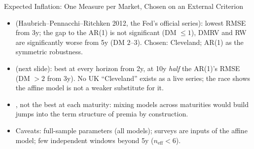 \begin{frame}[t]{Expected Inflation: One Measure per Market, Chosen on an External Criterion}
\vspace{0.06cm}
\raggedright\scriptsize
\begin{itemize}\itemsep=0.05cm\scriptsize
  \item {} (Haubrich--Pennacchi--Ritchken 2012, the Fed's official series): lowest
        RMSE from 3y; the gap to the AR(1) is not significant (DM $\le 1$), DMRV and RW are
        significantly worse from 5y (DM $2$--$3$). Chosen: Cleveland; AR(1) as the symmetric robustness.
  \item {} (next slide): best at every horizon from 2y, at 10y
        \emph{half} the AR(1)'s RMSE (DM $>2$ from 3y). No UK ``Cleveland'' exists as a live series;
        the race shows the affine model is not a weaker substitute for it.
  \item {}, not the best at each maturity: mixing models across maturities
        would build jumps into the term structure of premia by construction.
  \item Caveats: full-sample parameters (all models); surveys are inputs of the affine model; few
        independent windows beyond 5y ($n_{\text{eff}}<6$).
\end{itemize}
\end{frame}

